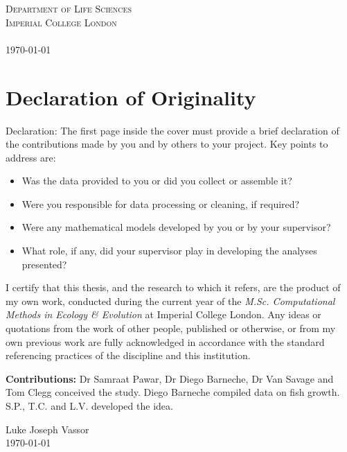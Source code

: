\documentclass[a4paper]{article} %
\begin{document}
\begin{titlepage}
    \textsc{Department of Life Sciences \\ Imperial College London \\ \ }\\[1cm]
    \textsc{\today}\\[2cm] %
    
    \vfill %
    
\end{titlepage}

\section*{Declaration of Originality}\thispagestyle{plain}
    Declaration: The first page inside the cover must provide a brief declaration of the contributions
    made by you and by others to your project. Key points to address are:
    \begin{itemize}
        \item Was the data provided to you or did you collect or assemble it?
        \item Were you responsible for data processing or cleaning, if required?
        \item Were any mathematical models developed by you or by your supervisor?
        \item What role, if any, did your supervisor play in developing the analyses presented?
    \end{itemize}
    I certify that this thesis, and the research to which it refers, are the product of my own work, conducted during the current year of the \emph{M.Sc. Computational Methods in Ecology \& Evolution} at Imperial College London. Any ideas or quotations from the work of other people, published or otherwise, or from my own previous work are fully acknowledged in accordance with the standard referencing practices of the discipline and this institution.

    \textbf{Contributions:} Dr Samraat Pawar, Dr Diego Barneche, Dr Van Savage and Tom Clegg conceived the study. Diego Barneche compiled data on fish growth. S.P., T.C. and L.V. developed the idea.
    \vspace{3cm}
    \begin{flushright}
        Luke Joseph Vassor \\
        \today
    \end{flushright}
\end{document}
